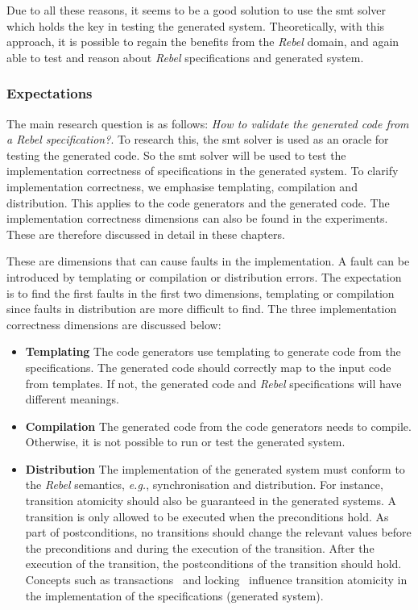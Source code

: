 Due to all these reasons, it seems to be a good solution to use the \gls{smt}
solver which holds the key in testing the generated system. Theoretically, with
this approach, it is possible to regain the benefits from the \textit{Rebel} domain, and
again able to test and reason about \textit{Rebel} specifications and generated system.

\subsubsection{Expectations}

The main research question is as follows: \textit{How to validate the generated code
from a Rebel specification?}. To research this, the \gls{smt} solver is used as
an oracle for testing the generated code. So the \gls{smt} solver will be used
to test the implementation correctness of specifications in the generated
system. To clarify implementation correctness, we emphasise templating,
compilation and distribution. This applies to the code generators and the
generated code. The implementation correctness dimensions can also be found in
the experiments. These are therefore discussed in detail in these chapters.

These are dimensions that can cause faults in the implementation. A fault can
be introduced by templating or compilation or distribution errors.
The expectation is to find the first faults in the first two dimensions,
templating or compilation since faults in distribution are more difficult to
find. The three implementation correctness dimensions are discussed below:
\begin{itemize}
  \item \textbf{Templating} The code generators use templating to generate code
  from the specifications. The generated code should correctly map to the input
  code from templates. If not, the generated code and \textit{Rebel}
  specifications will have different meanings.
  \item \textbf{Compilation} The generated code from the code generators needs
  to compile. Otherwise, it is not possible to run or test the generated system.
  \item \textbf{Distribution} The implementation of the generated system must
  conform to the \textit{Rebel} semantics, \textit{e.g.}, synchronisation and
  distribution. For instance, transition atomicity should also be guaranteed in
  the generated systems. A transition is only allowed to be executed when the
  preconditions hold. As part of postconditions, no transitions should change
  the relevant values before the preconditions and during the execution of the
  transition. After the execution of the transition, the postconditions of the
  transition should hold.
  Concepts such as transactions~\cite[p.~6]{tanenbaum2017distributed} and
  locking~\cite[p.~10]{tanenbaum2017distributed} influence transition atomicity
  in the implementation of the specifications (generated system).
\end{itemize}

